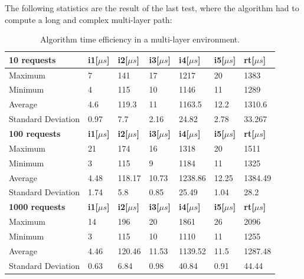 \documentclass[10pt,a4paper]{report}
\begin{document}
The following statistics are the result of the last test, where the
algorithm had to compute a long and complex multi-layer path:

\begin{table}[!htbp]
  \begin{center}
    \begin{tabular}{|l||l|l|l|l|l||l|}
      \hline
      \textbf{10 requests} & \textbf{i1[\(\mu s\)]} & \textbf{i2[\(\mu s\)]} & \textbf{i3[\(\mu s\)]} & \textbf{i4[\(\mu s\)]} &
      \textbf{i5[\(\mu s\)]} & \textbf{rt[\(\mu s\)]} \\\hline
      Maximum & 7 & 141 & 17 & 1217 & 20 & 1383 \\
      Minimum & 4 & 115 & 10 & 1146 & 11 & 1289 \\
      Average & 4.6 & 119.3 & 11 & 1163.5 & 12.2 & 1310.6 \\
      Standard Deviation & 0.97 & 7.7 & 2.16 & 24.82 & 2.78 & 33.267
      \\ \hline
      \textbf{100 requests} & \textbf{i1[\(\mu s\)]} & \textbf{i2[\(\mu s\)]} & \textbf{i3[\(\mu s\)]} & \textbf{i4[\(\mu s\)]} &
      \textbf{i5[\(\mu s\)]} & \textbf{rt[\(\mu s\)]} \\\hline
      Maximum & 21 & 174 & 16 & 1318 & 20 & 1511 \\
      Minimum & 3 & 115 & 9 & 1184 & 11 & 1325 \\
      Average & 4.48 & 118.17 & 10.73 & 1238.86 & 12.25 & 1384.49 \\
      Standard Deviation & 1.74 & 5.8 & 0.85 & 25.49 & 1.04 & 28.2 
      \\ \hline
      \textbf{1000 requests} & \textbf{i1[\(\mu s\)]} & \textbf{i2[\(\mu s\)]} & \textbf{i3[\(\mu s\)]} & \textbf{i4[\(\mu s\)]} &
      \textbf{i5[\(\mu s\)]} & \textbf{rt[\(\mu s\)]} \\\hline
      Maximum & 14 & 196 & 20 & 1861 & 26 & 2096 \\
      Minimum & 3 & 115 & 10 & 1110 & 11 & 1255 \\
      Average & 4.46 & 120.46 & 11.53 & 1139.52 & 11.5 & 1287.48 \\
      Standard Deviation & 0.63 & 6.84 & 0.98 & 40.84 & 0.91 & 44.44
      \\ \hline
    \end{tabular}
    \caption[Algorithm time efficiency in a multi-layer environment]{Algorithm time
      efficiency in a multi-layer environment.}
    \label{tab:test_opt}
  \end{center}
\end{table}
\end{document}
